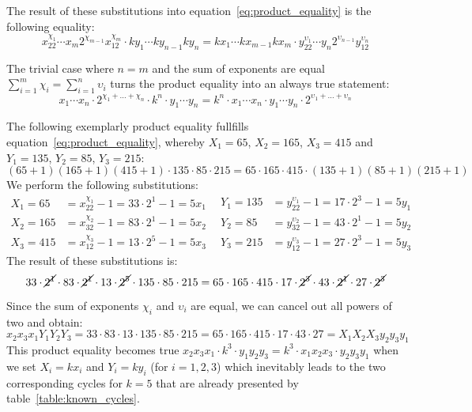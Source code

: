 The result of these substitutions into equation~\ref{eq:product_equality} is the following equality:
\[
x_22^{\chi_1}\cdots x_m2^{\chi_{m-1}}x_12^{\chi_m}\cdot ky_1\cdots ky_{n-1}ky_n=kx_1\cdots kx_{m-1}kx_m\cdot y_22^{\upsilon_1}\cdots y_n2^{\upsilon_{n-1}}y_12^{\upsilon_n}
\]

The trivial case where $n=m$ and the sum of exponents are equal $\sum_{i=1}^{m}\chi_i=\sum_{i=1}^{n}\upsilon_i$ turns the product equality into an always true statement:
\[
x_1\cdots x_n\cdot2^{\chi_1+\ldots+\chi_n}\cdot k^n\cdot y_1\cdots y_n=k^n\cdot x_1\cdots x_n\cdot y_1\cdots y_n\cdot2^{\upsilon_1+\ldots+\upsilon_n}
\]

\begin{example}
The following exemplarly product equality fullfills equation~\ref{eq:product_equality}, whereby $X_1=65$, $X_2=165$, $X_3=415$ and $Y_1=135$, $Y_2=85$, $Y_3=215$:
\[
(65+1)(165+1)(415+1)\cdot135\cdot85\cdot215=65\cdot165\cdot415\cdot(135+1)(85+1)(215+1)
\]
We perform the following substitutions:
\[
\begin{array}{ll}
X_1=65&=x_22^{\chi_1}-1=33\cdot2^1-1=5x_1\\
X_2=165&=x_32^{\chi_2}-1=83\cdot2^1-1=5x_2\\
X_3=415&=x_12^{\chi_3}-1=13\cdot2^5-1=5x_3
\end{array}\enspace
\begin{array}{ll}
Y_1=135&=y_22^{\upsilon_1}-1=17\cdot2^3-1=5y_1\\
Y_2=85&=y_32^{\upsilon_2}-1=43\cdot2^1-1=5y_2\\
Y_3=215&=y_12^{\upsilon_3}-1=27\cdot2^3-1=5y_3
\end{array}
\]
The result of these substitutions is:
\[
33\cdot\cancel{2^1}\cdot83\cdot\cancel{2^1}\cdot13\cdot\cancel{2^5}\cdot135\cdot85\cdot215=65\cdot165\cdot415\cdot17\cdot\cancel{2^3}\cdot43\cdot\cancel{2^1}\cdot27\cdot\cancel{2^3}
\]
Since the sum of exponents $\chi_i$ and $\upsilon_i$ are equal, we can cancel out all powers of two and obtain:
\[
x_2x_3x_1Y_1Y_2Y_3=33\cdot83\cdot13\cdot135\cdot85\cdot215=65\cdot165\cdot415\cdot17\cdot43\cdot27=X_1X_2X_3y_2y_3y_1
\]
This product equality becomes true $x_2x_3x_1\cdot k^3\cdot y_1y_2y_3=k^3\cdot x_1x_2x_3\cdot y_2y_3y_1$ when we set $X_i=kx_i$ and $Y_i=ky_i$ (for $i=1,2,3$) which inevitably leads to the two corresponding cycles for $k=5$ that are already presented by table~\ref{table:known_cycles}.
\end{example}

